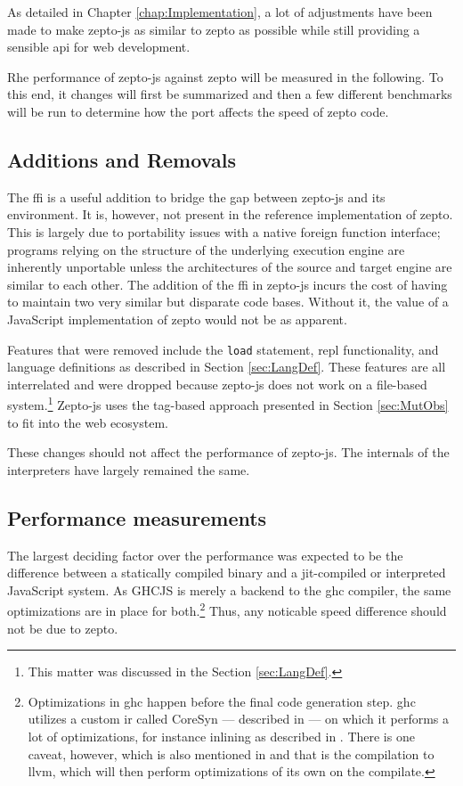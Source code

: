 \documentclass[oneside,11pt,xetex]{scrbook}
\begin{document}
As detailed in Chapter \ref{chap:Implementation}, a lot of adjustments have been made
to make zepto-js as similar to zepto as possible while still providing a sensible \gls{api}
for web development.

Rhe performance of zepto-js against zepto will be measured in the following.
To this end, it  changes will first be summarized and then a few different
benchmarks will be run to determine how the port affects the speed of zepto
code.

\subsection{Additions and Removals}

The \gls{ffi} is a useful addition to bridge the gap between zepto-js and its
environment. It is, however, not present in the reference implementation of zepto.
This is largely due to portability issues with a native foreign function interface;
programs relying on the structure of the underlying execution engine are inherently
unportable unless the architectures of the source and target engine are similar to
each other. The addition of the \gls{ffi} in zepto-js incurs the cost of having to
maintain two very similar but disparate code bases. Without it, the value of a
JavaScript implementation of zepto would not be as apparent.

Features that were removed include the \texttt{load} statement, \gls{repl} functionality,
and language definitions as described in Section \ref{sec:LangDef}. These features
are all interrelated and were dropped because zepto-js does not work on a file-based
system.\footnote{This matter was discussed in the Section \ref{sec:LangDef}.} Zepto-js
uses the tag-based approach presented in Section \ref{sec:MutObs} to fit into the web
ecosystem.

These changes should not affect the performance of zepto-js. The internals of the
interpreters have largely remained the same.

\subsection{Performance measurements}

The largest deciding factor over the performance was expected to be the difference
between a statically compiled binary and a \gls{jit}-compiled or interpreted
JavaScript system. As GHCJS is merely a backend to the \gls{ghc} compiler, the
same optimizations are in place for both.\footnote{Optimizations in \gls{ghc} happen
before the final code generation step. \gls{ghc} utilizes a custom \gls{ir} called
CoreSyn --- described in \cite{CORE} --- on which it performs a lot of optimizations,
for instance inlining as described in \cite{SECR}. There is one caveat, however, which
is also mentioned in \cite{CORE} and that is the compilation to \gls{llvm}, which will
then perform optimizations of its own on the compilate.} Thus, any noticable speed difference
should not be due to zepto.
\end{document}
